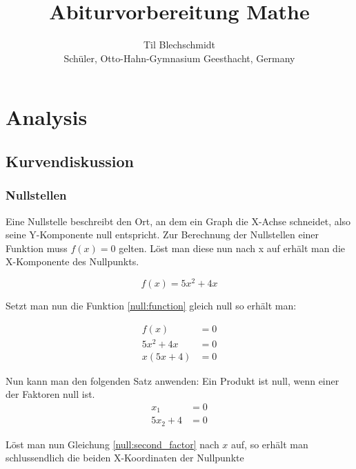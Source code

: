 \documentclass[a4paper]{article}
\title{}
\author{}
\title{Abiturvorbereitung Mathe}
\author{Til Blechschmidt\\ Schüler, Otto-Hahn-Gymnasium Geesthacht, Germany}
\begin{document}
	\maketitle
	\newpage
	
	\tableofcontents
	\listoffigures
	\listoftables
	\newpage

	\section{Analysis}
		\subsection{Kurvendiskussion}
			\subsubsection{Nullstellen}
				Eine Nullstelle beschreibt den Ort, an dem ein Graph die X-Achse schneidet, also seine Y-Komponente null entspricht.
				Zur Berechnung der Nullstellen einer Funktion muss $f(x) = 0$ gelten. Löst man diese nun nach x auf erhält man die X-Komponente des Nullpunkts.
				
				\begin{equation} \label{null:function}
				f(x) = 5x^2 + 4x
				\end{equation}
				
				Setzt man nun die Funktion \ref{null:function} gleich null so erhält man:
				
				\begin{equation}
					\begin{split}
						f(x) &= 0\\
						5x^2 + 4x &= 0\\
						x(5x + 4) &= 0
					\end{split}
				\end{equation}
				
				Nun kann man den folgenden Satz anwenden: Ein Produkt ist null, wenn einer der Faktoren null ist.\\
				
				\begin{align}
					x_1 &= 0\\
					5x_2 + 4 &= 0 \label{null:second_factor}
				\end{align}
				
				Löst man nun Gleichung \ref{null:second_factor} nach $x$ auf, so erhält man schlussendlich die beiden X-Koordinaten der Nullpunkte
				
\end{document}
